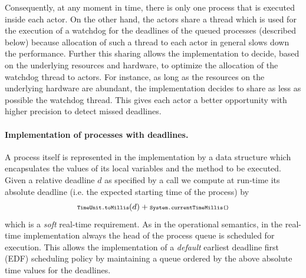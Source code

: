 Consequently, at any moment in time, there is only one process that is executed inside each actor.
On the other hand, the actors share a thread which is used
for the execution of a  watchdog for the deadlines of the queued processes (described below) because allocation of such a   thread to each actor  in general slows down the performance.
Further  this sharing  allows the implementation to decide, based on the underlying resources and hardware, to optimize the allocation of the watchdog thread to actors.
For instance, as long as the resources on the underlying hardware are abundant, the implementation decides to share as less as possible the watchdog thread.
This gives each actor a better opportunity with higher precision to detect missed deadlines.


\paragraph*{Implementation of processes with deadlines.}
A process itself is represented in the implementation by a data structure
which encapsulates the values of its local variables and the method to be executed.
Given a relative deadline $d$ as specified by a call
we compute at run-time its absolute deadline (i.e. the expected starting time of the process) by
$$
 {\scriptsize\texttt{TimeUnit.toMillis}}(d) + {\scriptsize\texttt{System.currentTimeMillis()}}
$$
which is a \emph{soft} real-time requirement.
As in the operational semantics, in the real-time implementation
always the head of the process queue  is scheduled for execution.
This allows the implementation of a \emph{default}
earliest deadline first (EDF) scheduling policy
by  maintaining a queue ordered by  the above absolute time values for the deadlines.


